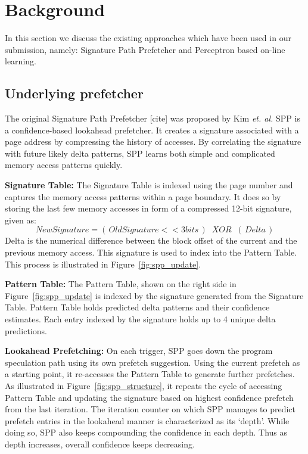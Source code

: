 \section{Background}
\label{Background}
In this section we discuss the existing approaches which have been 
used in our submission,  namely: Signature Path Prefetcher and Perceptron 
based on-line learning.

\subsection{Underlying prefetcher}
\label{sec:Background-SPP}
The original Signature Path Prefetcher [cite] was proposed by Kim 
{\em et. al.} SPP is a confidence-based lookahead prefetcher. 
It creates a signature associated with a page address by compressing 
the history of accesses. By correlating the signature with future 
likely delta patterns, SPP learns both simple and complicated 
memory access patterns quickly.

\noindent \textbf{Signature Table:} 
The Signature Table is indexed using the page number and captures the memory 
access patterns within a page boundary. It does so by storing the last few
memory accesses in form of a compressed 12-bit signature, given as:
$$New Signature = (\,Old Signature << 3 bits\,) \;\;XOR\;\; (\,Delta\,)$$ 
Delta is the numerical difference between the block offset of the current 
and the previous memory access. This signature is used to index into the 
Pattern Table. This process is illustrated in Figure~\ref{fig:spp_update}.

\noindent \textbf{Pattern Table:} The Pattern Table, shown on the right
side in Figure~\ref{fig:spp_update} is indexed by the signature
generated from the Signature Table.  Pattern Table holds predicted
delta patterns and their confidence estimates. Each entry indexed by
the signature holds up to 4 unique delta predictions.

\noindent \textbf{Lookahead Prefetching:} On each trigger, SPP goes
down the program speculation path using its own prefetch suggestion.
Using the current prefetch as a starting point, it re-accesses the Pattern
Table to generate further prefetches.  As illustrated in
Figure~\ref{fig:spp_structure}, it repeats the cycle of accessing
Pattern Table and updating the signature based on highest confidence
prefetch from the last iteration.  The iteration counter on which SPP
manages to predict prefetch entries in the lookahead manner is
characterized as its `depth'. While doing so, SPP also keeps
compounding the confidence in each depth. Thus as depth increases,
overall confidence keeps decreasing.

